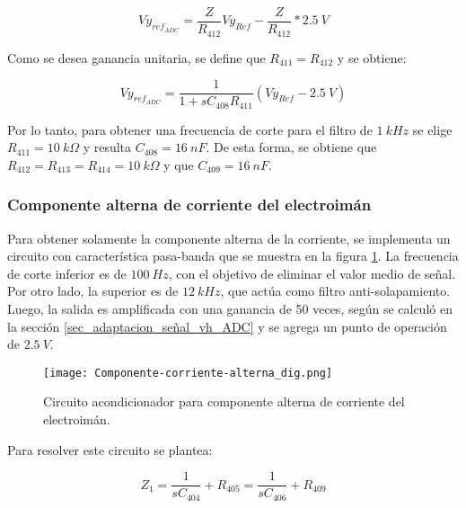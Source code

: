 \begin{equation*} 
	Vy_{ref_{ADC}}=\frac{Z}{R_{412}}Vy_{Ref}-\frac{Z}{R_{412}}*2.5\:V
\end{equation*}


Como se desea ganancia unitaria, se define que $R_{411}=R_{412}$ y se obtiene:

\begin{equation*} 
	Vy_{ref_{ADC}}=\frac{1}{1+sC_{408}R_{411}}(Vy_{Ref}-2.5\:V)
\end{equation*}


Por lo tanto, para obtener una frecuencia de corte para el filtro de $1\:kHz$ se elige $R_{411}=10\:k\Omega$ y resulta $C_{408}=16\:nF$. De esta forma, se obtiene que $R_{412}=R_{413}=R_{414}=10\:k\Omega$ y que $C_{409}=16\:nF$.


\subsubsection{Componente  alterna de corriente del electroimán}

 Para obtener solamente la componente alterna de la corriente, se implementa un circuito con característica pasa-banda que se muestra en la figura \ref{fig:componente-corriente-alterna}. La frecuencia de corte inferior  es de $100\:Hz$, con el objetivo de eliminar el valor medio de señal. Por otro lado, la superior es de $12\:kHz$, que actúa como filtro anti-solapamiento. Luego, la salida es amplificada con una ganancia de 50 veces, según se calculó en la sección \ref{sec_adaptacion_señal_vh_ADC} y se agrega un punto de operación de $2.5\:V$.


\begin{figure}[H]
	\centering
	\texttt{[image: Componente-corriente-alterna\_dig.png]}
	\caption{ Circuito acondicionador para componente alterna de corriente del electroimán.
	}
	\label{fig:componente-corriente-alterna}
\end{figure}

Para resolver este circuito se plantea:

\begin{equation*} 
	Z_1=\frac{1}{sC_{404}}+R_{405}=\frac{1}{sC_{406}}+R_{409}
\end{equation*}

